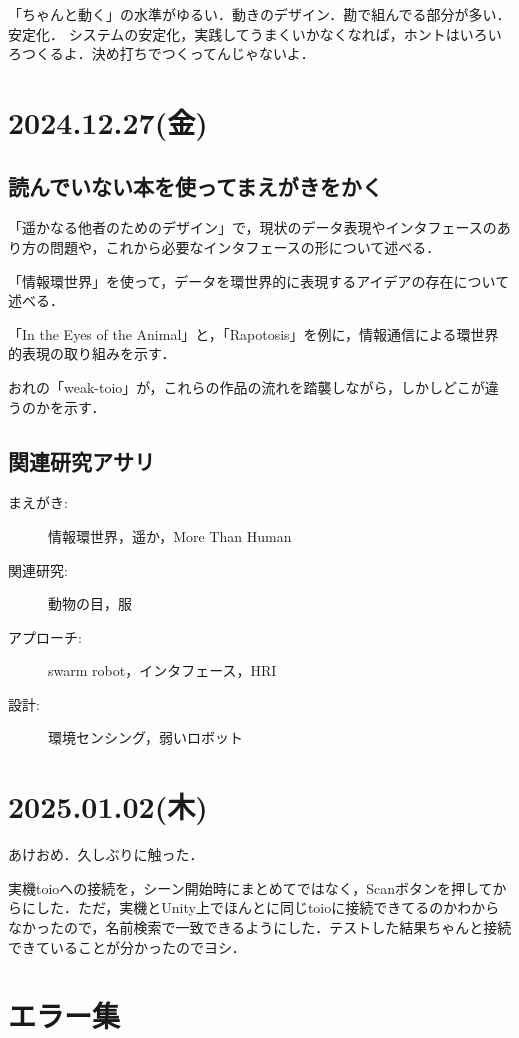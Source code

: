 \documentclass[fleqn,twocolumn]{mynote}
\begin{document}
  「ちゃんと動く」の水準がゆるい．動きのデザイン．勘で組んでる部分が多い．安定化．
  システムの安定化，実践してうまくいかなくなれば，ホントはいろいろつくるよ．決め打ちでつくってんじゃないよ．

  \section*{2024.12.27(金)}

  \subsection*{読んでいない本を使ってまえがきをかく}
  「遥かなる他者のためのデザイン」で，現状のデータ表現やインタフェースのあり方の問題や，これから必要なインタフェースの形について述べる．

  「情報環世界」を使って，データを環世界的に表現するアイデアの存在について述べる．

  「In the Eyes of the Animal」と，「Rapotosis」を例に，情報通信による環世界的表現の取り組みを示す．

  おれの「weak-toio」が，これらの作品の流れを踏襲しながら，しかしどこが違うのかを示す．

  \subsection*{関連研究アサリ}
  \begin{description}
    \item[まえがき:]情報環世界，遥か，More Than Human
    \item[関連研究:]動物の目，服
    \item[アプローチ:]swarm robot，インタフェース，HRI
    \item[設計:]環境センシング，弱いロボット
  \end{description}

  \section*{2025.01.02(木)}
  あけおめ．久しぶりに触った．

  実機toioへの接続を，シーン開始時にまとめてではなく，Scanボタンを押してからにした．ただ，実機とUnity上でほんとに同じtoioに接続できてるのかわからなかったので，名前検索で一致できるようにした．テストした結果ちゃんと接続できていることが分かったのでヨシ．

  \section*{エラー集}
\end{document}
